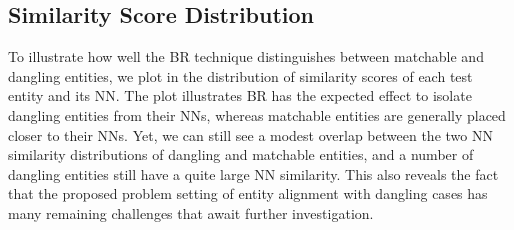 \subsection{Similarity Score Distribution}\label{sect:viz}
To illustrate how well the BR technique distinguishes between matchable and dangling entities, we plot in  the distribution of similarity scores of each test entity and its NN.  
The plot illustrates BR has the expected effect to isolate dangling entities from their NNs, whereas matchable entities are generally placed closer to their NNs.
Yet, we can still see a modest overlap between the two NN similarity distributions of dangling and matchable entities, and a number of dangling entities still have a quite large NN similarity.
This also reveals the fact that the proposed problem setting of entity alignment with dangling cases has many remaining challenges that await further investigation.
